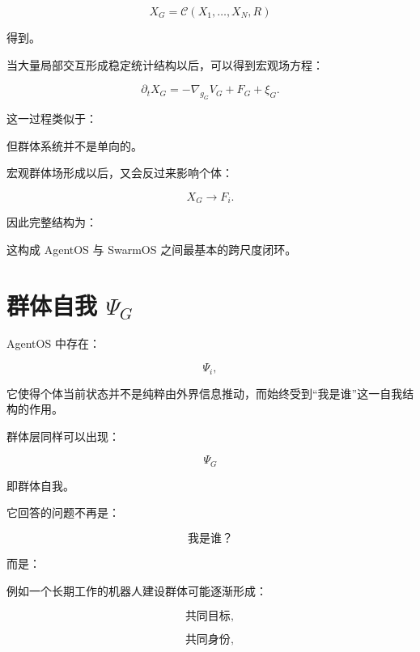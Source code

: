 \[
X_G
=
\mathcal{C}
\left(
X_1,
\dots,
X_N,
R
\right)
\]

得到。

当大量局部交互形成稳定统计结构以后，可以得到宏观场方程：

\[
\partial_t X_G
=
-\nabla_{g_G}V_G
+
F_G
+
\xi_G.
\]

这一过程类似于：

\begin{statementbox}
\centering
{}
\end{statementbox}

但群体系统并不是单向的。

宏观群体场形成以后，又会反过来影响个体：

\[
X_G
\rightarrow
F_i.
\]

因此完整结构为：

\begin{statementbox}
\centering
{}
\end{statementbox}

这构成 AgentOS 与 SwarmOS 之间最基本的跨尺度闭环。


\section{群体自我 $\Psi_G$}

AgentOS 中存在：

\[
\Psi_i,
\]

它使得个体当前状态并不是纯粹由外界信息推动，而始终受到``我是谁''这一自我结构的作用。

群体层同样可以出现：

\[
\boxed{
\Psi_G
}
\]

即群体自我。

它回答的问题不再是：

\[
\text{我是谁？}
\]

而是：

\begin{statementbox}
\centering
{}
\end{statementbox}

例如一个长期工作的机器人建设群体可能逐渐形成：

\[
\text{共同目标},
\]

\[
\text{共同身份},
\]

